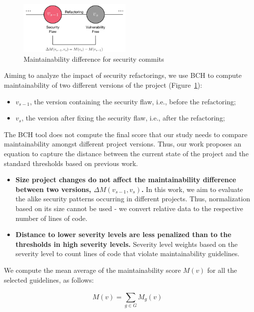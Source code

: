 \documentclass[10pt,conference]{IEEEtran}
\begin{document}
\begin{figure}[h]
 	\centering 	\includegraphics[width=0.49\textwidth]{figures/commit.pdf}
 	\caption{Maintainability difference for security commits}
	\label{fig:commit}
\end{figure}

Aiming to analyze the impact of security refactorings, we use BCH to compute
maintainability of two different versions of the project (Figure~\ref{fig:commit}):
\begin{itemize}
	\item $v_{s-1}$, the version containing the security flaw, i.e., before the
	refactoring;
	\item $v_{s}$, the version after fixing the security flaw, i.e., after the
	refactoring;
\end{itemize}

The BCH tool does not compute the final score that our study needs to compare
maintainability amongst different project versions. Thus, our work proposes an
equation to capture the distance between the current state of the project and
the standard thresholds based on previous work\cite{Olivari:2018}.
\begin{itemize}
	\item \textbf{Size project changes do not affect the maintainability
	difference between two versions, $\Delta M (v_{s-1},v_{s})$.} In this work, we
	aim to evaluate the alike security patterns occurring in different projects.
	Thus, normalization based on its size cannot be used - we convert relative
	data to the respective number of lines of code.
	\item \textbf{Distance to lower severity levels are less penalized than to the
	thresholds in high severity levels.} Severity level weights based on the
	severity level to count lines of code that violate maintainability guidelines.
\end{itemize}

We compute the mean average of the maintainability score $M(v)$ for all the
selected guidelines, as follows:

\begin{equation}
    M(v) = \sum_{g \in G}^{} M_{g}(v)
\end{equation}
\end{document}
